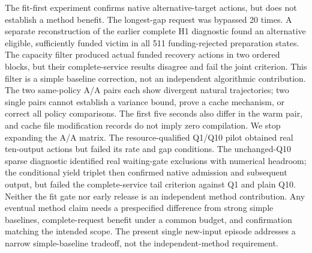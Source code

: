 \documentclass[10pt]{article}
\begin{document}
The fit-first experiment confirms native alternative-target actions, but does not establish a method benefit. The longest-gap request was bypassed 20 times. A separate reconstruction of the earlier complete H1 diagnostic found an alternative eligible, sufficiently funded victim in all 511 funding-rejected preparation states. The capacity filter produced actual funded recovery actions in two ordered blocks, but their complete-service results disagree and fail the joint criterion. This filter is a simple baseline correction, not an independent algorithmic contribution. The two same-policy A/A pairs each show divergent natural trajectories; two single pairs cannot establish a variance bound, prove a cache mechanism, or correct all policy comparisons. The first five seconds also differ in the warm pair, and cache file modification records do not imply zero compilation. We stop expanding the A/A matrix. The resource-qualified Q1/Q10 pilot obtained real ten-output actions but failed its rate and gap conditions. The unchanged-Q10 sparse diagnostic identified real waiting-gate exclusions with numerical headroom; the conditional yield triplet then confirmed native admission and subsequent output, but failed the complete-service tail criterion against Q1 and plain Q10. Neither the fit gate nor early release is an independent method contribution. Any eventual method claim needs a prespecified difference from strong simple baselines, complete-request benefit under a common budget, and confirmation matching the intended scope. The present single new-input episode addresses a narrow simple-baseline tradeoff, not the independent-method requirement.
\end{document}
